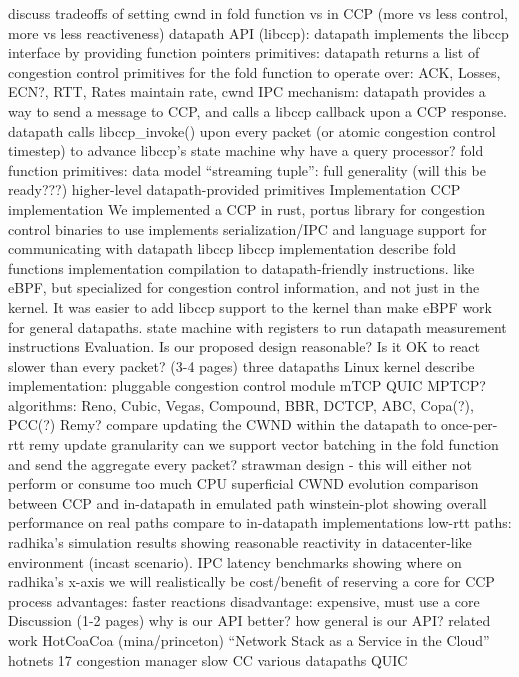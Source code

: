 \begin{outline}[enumerate]
            \4 discuss tradeoffs of setting cwnd in fold function vs in CCP (more vs less control, more vs less reactiveness)
        \3 datapath API (libccp): datapath implements the libccp interface by providing function pointers
            \4 primitives: datapath returns a list of congestion control primitives for the fold function to operate over: ACK, Losses, ECN?, RTT, Rates
            \4 maintain rate, cwnd
            \4 IPC mechanism: datapath provides a way to send a message to CCP, and calls a libccp callback upon a CCP response.
            \4 datapath calls libccp\_invoke() upon every packet (or atomic congestion control timestep) to advance libccp's state machine
        \3 why have a query processor?
        \3 fold function primitives: data model
            \4 ``streaming tuple'': full generality (will this be ready???)
            \4 higher-level datapath-provided primitives
\1 Implementation
    \2 CCP implementation
        \3 We implemented a CCP in rust, portus
        \3 library for congestion control binaries to use
            \4 implements serialization/IPC and language support for communicating with datapath libccp
    \2 libccp implementation
        \3 describe fold functions implementation
            \4 compilation to datapath-friendly instructions. like eBPF, but specialized for congestion control information, and not just in the kernel. It was easier to add libccp support to the kernel than make eBPF work for general datapaths.
            \4 state machine with registers to run datapath measurement instructions
\1 Evaluation. Is our proposed design reasonable? Is it OK to react slower than every packet? (3-4 pages)
    \2 three datapaths
        \3 Linux kernel
            \4 describe implementation: pluggable congestion control module
        \3 mTCP
        \3 QUIC
        \3 MPTCP?
    \2 algorithms:
        \3 Reno, Cubic, Vegas, Compound, BBR, DCTCP, ABC, Copa(?), PCC(?)
        \3 Remy?
            \4 compare updating the CWND within the datapath to once-per-rtt remy
    \2 update granularity
        \3 can we support vector batching in the fold function and send the aggregate every packet?
        \3 strawman design - this will either not perform or consume too much CPU
    \2 superficial CWND evolution comparison between CCP and in-datapath in emulated path
    \2 winstein-plot showing overall performance on real paths
        \3 compare to in-datapath implementations
    \2 low-rtt paths: radhika's simulation results showing reasonable reactivity in datacenter-like environment (incast scenario).
        \3 IPC latency benchmarks showing where on radhika's x-axis we will realistically be
        \3 cost/benefit of reserving a core for CCP process
            \4 advantages: faster reactions
            \4 disadvantage: expensive, must use a core
\1 Discussion (1-2 pages)
    \2 why is our API better?
        \3 how general is our API?
    \2 related work
        \3 HotCoaCoa (mina/princeton)
        \3 ``Network Stack as a Service in the Cloud'' hotnets 17
        \3 congestion manager
            \4 slow CC
        \3 various datapaths
            \4 QUIC
\end{outline}